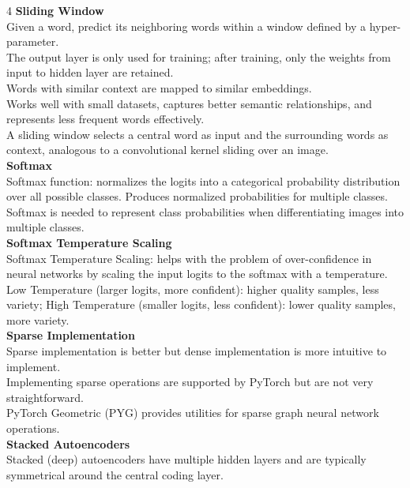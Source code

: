 \documentclass[8pt]{extarticle}
\begin{document}
\begin{multicols}{4}
\vspace{2pt}\textbf{Sliding Window}\\
Given a word, predict its neighboring words within a window defined by a hyper-parameter.\\
The output layer is only used for training; after training, only the weights from input to hidden layer are retained.\\
Words with similar context are mapped to similar embeddings.\\
Works well with small datasets, captures better semantic relationships, and represents less frequent words effectively.\\
A sliding window selects a central word as input and the surrounding words as context, analogous to a convolutional kernel sliding over an image.\\
\vspace{2pt}\textbf{Softmax}\\
Softmax function: normalizes the logits into a categorical probability distribution over all possible classes. Produces normalized probabilities for multiple classes.\\
Softmax is needed to represent class probabilities when differentiating images into multiple classes.\\
\vspace{2pt}\textbf{Softmax Temperature Scaling}\\
Softmax Temperature Scaling: helps with the problem of over-confidence in neural networks by scaling the input logits to the softmax with a temperature.\\
Low Temperature (larger logits, more confident): higher quality samples, less variety; High Temperature (smaller logits, less confident): lower quality samples, more variety.\\
\vspace{2pt}\textbf{Sparse Implementation}\\
Sparse implementation is better but dense implementation is more intuitive to implement.\\
Implementing sparse operations are supported by PyTorch but are not very straightforward.\\
PyTorch Geometric (PYG) provides utilities for sparse graph neural network operations.\\
\vspace{2pt}\textbf{Stacked Autoencoders}\\
Stacked (deep) autoencoders have multiple hidden layers and are typically symmetrical around the central coding layer.\\

\end{multicols}
\end{document}
